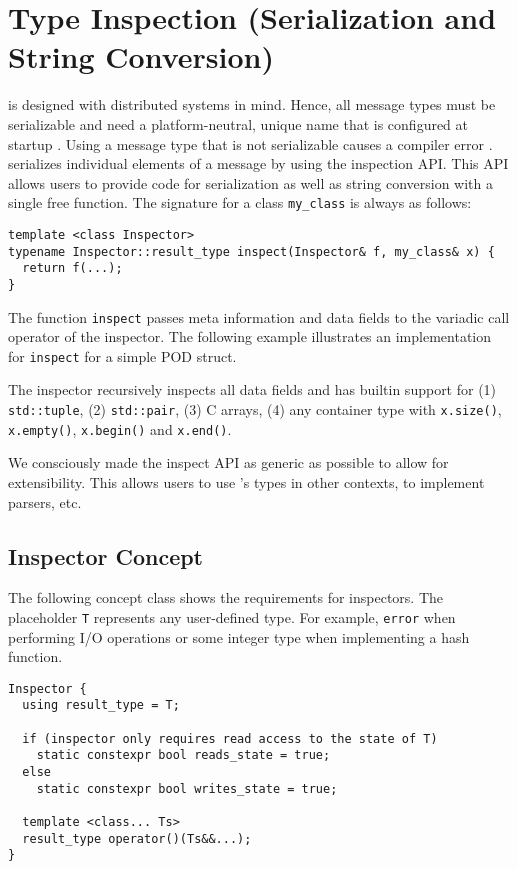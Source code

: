 \section{Type Inspection (Serialization and String Conversion)}
\label{type-inspection}

\lib is designed with distributed systems in mind. Hence, all message types
must be serializable and need a platform-neutral, unique name that is
configured at startup . Using a message type that
is not serializable causes a compiler error . \lib
serializes individual elements of a message by using the inspection API. This
API allows users to provide code for serialization as well as string conversion
with a single free function. The signature for a class \lstinline^my_class^ is
always as follows:

\begin{lstlisting}
template <class Inspector>
typename Inspector::result_type inspect(Inspector& f, my_class& x) {
  return f(...);
}
\end{lstlisting}

The function \lstinline^inspect^ passes meta information and data fields to the
variadic call operator of the inspector. The following example illustrates an
implementation for \lstinline^inspect^ for a simple POD struct.


The inspector recursively inspects all data fields and has builtin support for
(1) \lstinline^std::tuple^, (2) \lstinline^std::pair^, (3) C arrays, (4) any
container type with \lstinline^x.size()^, \lstinline^x.empty()^,
\lstinline^x.begin()^ and \lstinline^x.end()^.

We consciously made the inspect API as generic as possible to allow for
extensibility. This allows users to use \lib's types in other contexts, to
implement parsers, etc.

\subsection{Inspector Concept}

The following concept class shows the requirements for inspectors. The
placeholder \lstinline^T^ represents any user-defined type. For example,
\lstinline^error^ when performing I/O operations or some integer type when
implementing a hash function.

\begin{lstlisting}
Inspector {
  using result_type = T;

  if (inspector only requires read access to the state of T)
    static constexpr bool reads_state = true;
  else
    static constexpr bool writes_state = true;

  template <class... Ts>
  result_type operator()(Ts&&...);
}
\end{lstlisting}

